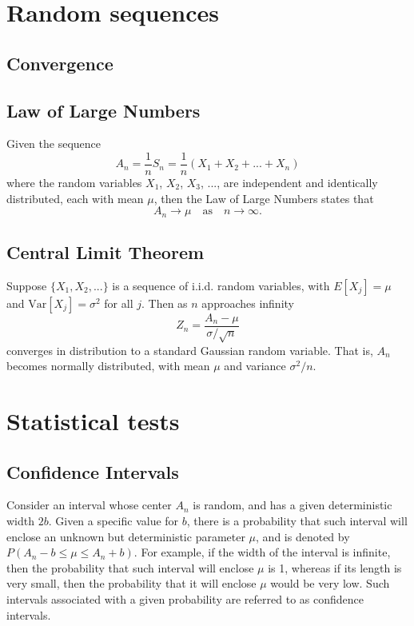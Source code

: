 \documentclass[11pt]{article}
\begin{document}
\section{Random sequences}
\subsection{Convergence}
\subsection{Law of Large Numbers}
Given the sequence
\begin{equation}
A_n = \frac{1}{n}S_n = \frac{1}{n} (X_1 + X_2 + ... + X_n )
\end{equation}
where the random variables $X_1$, $X_2$, $X_3$, ..., are independent and identically distributed, each with mean $\mu$, then the Law of Large Numbers states that
\begin{equation}
A_n \to \mu \quad \text{as} \quad n \to \infty.
\end{equation}

\subsection{Central Limit Theorem}
Suppose $\{X_1, X_2, ...\}$ is a sequence of i.i.d. random variables, with $E[X_j] = \mu$ and $\text{Var}[X_j] = \sigma^2$ for all $j$. Then as $n$ approaches infinity
\begin{equation}
Z_n = \frac{A_n - \mu}{\sigma/\sqrt{n}}
\end{equation}
converges in distribution to a standard Gaussian random variable. That is, $A_n$ becomes normally distributed, with mean $\mu$ and variance $\sigma^2/n$.
\section{Statistical tests}
\subsection{Confidence Intervals}
Consider an interval whose center $A_n$ is random, and has a given deterministic width $2b$. Given a specific value for $b$, there is a probability that such interval will enclose an unknown but deterministic parameter $\mu$, and is denoted by $P(A_n - b \le \mu \le A_n + b)$. For example, if the width of the interval is infinite, then the probability that such interval will enclose $\mu$ is 1, whereas if its length is very small, then the probability that it will enclose $\mu$ would be very low. Such intervals associated with a given probability are referred to as confidence intervals.
\end{document}
